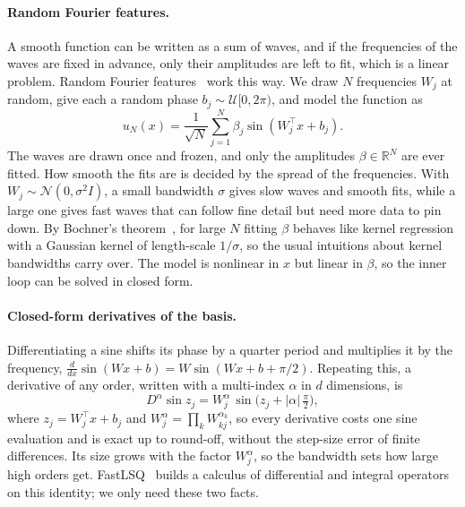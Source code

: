 \documentclass[fullpaper,final]{nldl}
\newcommand{\R}{\mathbb{R}}
\theoremstyle{plain}
\theoremstyle{definition}
\begin{document}
\paragraph{Random Fourier features.}
A smooth function can be written as a sum of waves, and if the frequencies of the
waves are fixed in advance, only their amplitudes are left to fit, which is a
linear problem. Random Fourier features~\citep{rahimi2007rff} work this way. We
draw $N$ frequencies $W_j$ at random, give each a random phase
$b_j \sim \mathcal{U}[0,2\pi)$, and model the function as
\begin{equation}
\label{eq:rff-basis}
u_N(x) = \frac{1}{\sqrt{N}} \sum_{j=1}^{N} \beta_j \sin(W_j^\top x + b_j).
\end{equation}
The waves are drawn once and frozen, and only the amplitudes $\beta \in \R^N$ are
ever fitted. How smooth the fits are is decided by the spread of the frequencies.
With $W_j \sim \mathcal{N}(0,\sigma^2 I)$, a small bandwidth $\sigma$ gives slow
waves and smooth fits, while a large one gives fast waves that can follow fine
detail but need more data to pin down. By Bochner's theorem~\citep{bochner1933},
for large $N$ fitting $\beta$ behaves like kernel regression with a Gaussian kernel
of length-scale $1/\sigma$, so the usual intuitions about kernel bandwidths carry
over. The model is nonlinear in $x$ but linear in $\beta$, so the inner loop can be
solved in closed form.

\paragraph{Closed-form derivatives of the basis.}
Differentiating a sine shifts its phase by a quarter period and multiplies it by the
frequency, $\tfrac{d}{dx}\sin(Wx+b) = W\sin(Wx+b+\pi/2)$. Repeating this, a derivative of
any order, written with a multi-index $\alpha$ in $d$ dimensions, is
\begin{equation}
\label{eq:cyclic}
D^\alpha \sin z_j = W_j^{\alpha}\, \sin\big(z_j + |\alpha|\,\tfrac{\pi}{2}\big),
\end{equation}
where $z_j = W_j^\top x + b_j$ and $W_j^{\alpha} = \prod_k W_{kj}^{\alpha_k}$, so
every derivative costs one sine evaluation and is exact up to round-off, without
the step-size error of finite differences. Its size grows with the factor
$W_j^{\alpha}$, so the bandwidth sets how large high orders get. FastLSQ~\citep{sulc2026fastlsq} builds a calculus of
differential and integral operators on this identity; we only need these two
facts.
\end{document}
